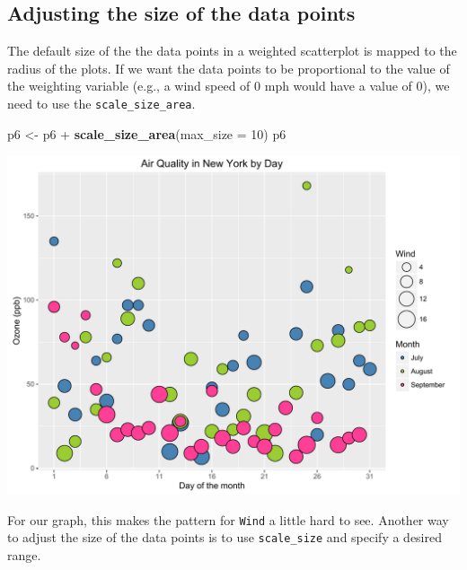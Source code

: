 \documentclass[]{article}
\newenvironment{Shaded}{\begin{snugshade}}{\end{snugshade}}
\newcommand{\KeywordTok}[1]{\textcolor[rgb]{0.13,0.29,0.53}{\textbf{{#1}}}}
\newcommand{\DataTypeTok}[1]{\textcolor[rgb]{0.13,0.29,0.53}{{#1}}}
\newcommand{\DecValTok}[1]{\textcolor[rgb]{0.00,0.00,0.81}{{#1}}}
\newcommand{\StringTok}[1]{\textcolor[rgb]{0.31,0.60,0.02}{{#1}}}
\newcommand{\NormalTok}[1]{{#1}}
\begin{document}
\subsection{Adjusting the size of the data
points}\label{adjusting-the-size-of-the-data-points}

The default size of the the data points in a weighted scatterplot is
mapped to the radius of the plots. If we want the data points to be
proportional to the value of the weighting variable (e.g., a wind speed
of 0 mph would have a value of 0), we need to use the
\texttt{scale\_size\_area}.

\begin{Shaded}
\begin{Highlighting}[]
\NormalTok{p6 <-}\StringTok{ }\NormalTok{p6 +}\StringTok{ }\KeywordTok{scale_size_area}\NormalTok{(}\DataTypeTok{max_size =} \DecValTok{10}\NormalTok{)}
\NormalTok{p6}
\end{Highlighting}
\end{Shaded}

\begin{center}\includegraphics{0_all_posts_pdf/wscatter_12-1} \end{center}

For our graph, this makes the pattern for \texttt{Wind} a little hard to
see. Another way to adjust the size of the data points is to use
\texttt{scale\_size} and specify a desired range.
\end{document}
